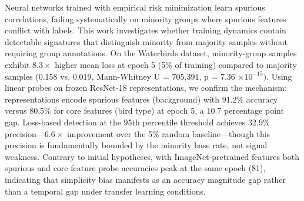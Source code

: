 
Neural networks trained with empirical risk minimization learn spurious correlations, failing systematically on minority groups where spurious features conflict with labels. This work investigates whether training dynamics contain detectable signatures that distinguish minority from majority samples without requiring group annotations. On the Waterbirds dataset, minority-group samples exhibit 8.$3\times$ higher mean loss at epoch 5 (5\% of training) compared to majority samples (0.158 vs. 0.019, Mann-Whitney U = 705,391, p = 7.36 $\times 10^{-15})$. Using linear probes on frozen ResNet-18 representations, we confirm the mechanism: representations encode spurious features (background) with 91.2\% accuracy versus 80.5\% for core features (bird type) at epoch 5, a 10.7 percentage point gap. Loss-based detection at the 95th percentile threshold achieves 32.9\% precision---6.$6\times$ improvement over the 5\% random baseline---though this precision is fundamentally bounded by the minority base rate, not signal weakness. Contrary to initial hypotheses, with ImageNet-pretrained features both spurious and core feature probe accuracies peak at the same epoch (81), indicating that simplicity bias manifests as an accuracy magnitude gap rather than a temporal gap under transfer learning conditions.

